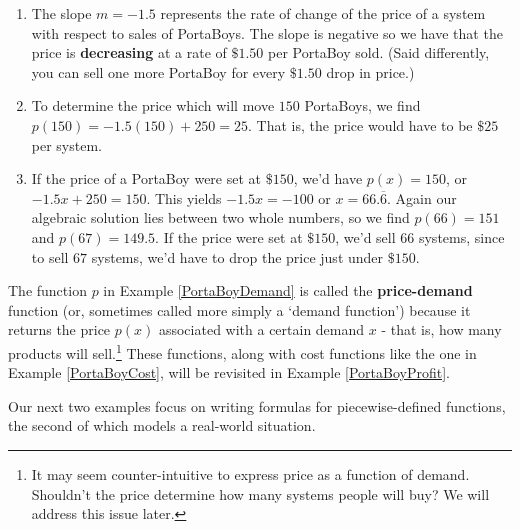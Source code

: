 \documentclass{ximera}
\begin{document}
\begin{example}
\begin{explanation}
\begin{enumerate}
Given that $x$ represents the number of PortaBoys sold, we need to choose to end the domain at either $x = 166$ or $x = 167$.  We have that $p(166) = 1 > 0$ but $p(167) = -0.5 < 0$ so we settle on the domain $[0,166]$.  Our final answer is $p(x) = -1.5x + 250$ restricted to $0 \leq x \leq 166$ which is graphed above on the right.

\item The slope $m = -1.5$ represents the rate of change of the price of a system with respect to sales of PortaBoys.  The slope is negative so we have that the price is \textbf{decreasing} at a rate of $\$1.50$ per PortaBoy sold.  (Said differently, you can sell one more PortaBoy for every $\$1.50$ drop in price.)

\item  To determine the price which will move $150$ PortaBoys, we find $p(150) = -1.5(150) + 250 = 25$.  That is, the price would have to be $\$25$ per system.

\item  If the price of a PortaBoy were set at $\$150$, we'd have $p(x) = 150$, or $-1.5x + 250 = 150$.  This yields $-1.5x = -100$ or $x = 66.\overline{6}$. Again our algebraic solution lies between two whole numbers, so we find $p(66) = 151$ and $p(67) = 149.5$.  If the price were set at $\$ 150$, we'd sell $66$ systems, since to sell $67$ systems, we'd have to drop the price just under $\$150$.  

\end{enumerate}
\end{explanation}

\end{example}

The function $p$ in Example \ref{PortaBoyDemand} is called the \textbf{price-demand} function (or, sometimes called more simply a `demand function') because it returns the price $p(x)$ associated with a certain demand $x$ - that is, how many products will sell.\footnote{It may seem counter-intuitive to express price as a function of demand.  Shouldn't the price determine how many systems people will buy?  We will address this issue later.}  These functions, along with cost functions like the one in Example \ref{PortaBoyCost}, will be revisited in Example \ref{PortaBoyProfit}.



Our next two examples focus on writing formulas for piecewise-defined functions, the second of which models a real-world situation.
\end{document}
